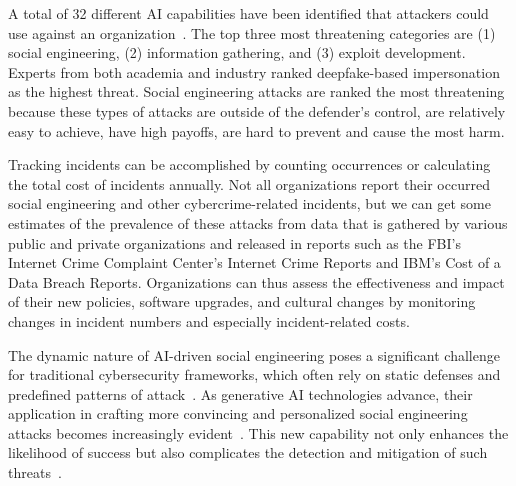 






%
%
A total of 32 different AI capabilities have been identified that attackers could use against an organization~\citep{mirsky_Threat_Offensive_AI_Organizations_2023}. The top three most threatening categories are (1) social engineering, (2) information gathering, and (3) exploit development. Experts from both academia and industry ranked deepfake-based impersonation as the highest threat. Social engineering attacks are ranked the most threatening because these types of attacks are outside of the defender's control, are relatively easy to achieve, have high payoffs, are hard to prevent and cause the most harm.



Tracking incidents can be accomplished by counting occurrences or calculating the total cost of incidents annually. Not all organizations report their occurred social engineering and other cybercrime-related incidents, but we can get some estimates of the prevalence of these attacks from data that is gathered by various public and private organizations and released in reports such as the FBI's Internet Crime Complaint Center's Internet Crime Reports and IBM's Cost of a Data Breach Reports. Organizations can thus assess the effectiveness and impact of their new policies, software upgrades, and cultural changes by monitoring changes in incident numbers and especially incident-related costs.







The dynamic nature of AI-driven social engineering poses a significant challenge for traditional cybersecurity frameworks, which often rely on static defenses and predefined patterns of attack~\citep{fakhouri_AI_Driven_Solutions_SE_Attacks_2024}. As generative AI technologies advance, their application in crafting more convincing and personalized social engineering attacks becomes increasingly evident~\citep{blauth_AI_Crime_Overview_Malicious_Use_Abuse_2022}. This new capability not only enhances the likelihood of success but also complicates the detection and mitigation of such threats~\citep{mirsky_Threat_Offensive_AI_Organizations_2023}.



